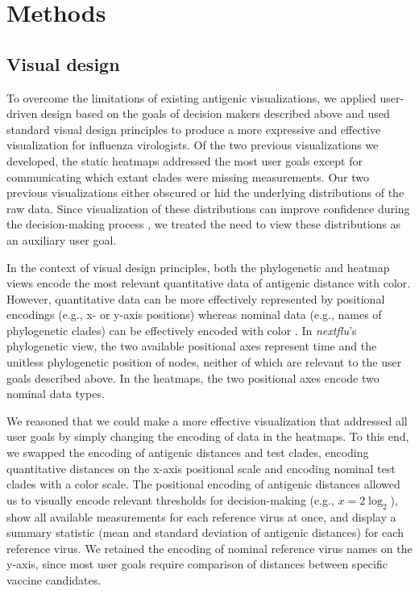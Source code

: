 \documentclass[utf8]{FrontiersinHarvard} %
\begin{document}
\section{Methods}

\subsection{Visual design}

To overcome the limitations of existing antigenic visualizations, we applied user-driven design based on the goals of decision makers described above and used standard visual design principles to produce a more expressive and effective visualization for influenza virologists.
Of the two previous visualizations we developed, the static heatmaps addressed the most user goals except for communicating which extant clades were missing measurements.
Our two previous visualizations either obscured or hid the underlying distributions of the raw data.
Since visualization of these distributions can improve confidence during the decision-making process \citep{correll2014error,Hullman2015,Fernandes2018}, we treated the need to view these distributions as an auxiliary user goal.

In the context of visual design principles, both the phylogenetic and heatmap views encode the most relevant quantitative data of antigenic distance with color.
However, quantitative data can be more effectively represented by positional encodings (e.g., x- or y-axis positions) whereas nominal data (e.g., names of phylogenetic clades) can be effectively encoded with color \citep{Mackinlay1986}.
In \emph{nextflu}'s phylogenetic view, the two available positional axes represent time and the unitless phylogenetic position of nodes, neither of which are relevant to the user goals described above.
In the heatmaps, the two positional axes encode two nominal data types.

We reasoned that we could make a more effective visualization that addressed all user goals by simply changing the encoding of data in the heatmaps.
To this end, we swapped the encoding of antigenic distances and test clades, encoding quantitative distances on the x-axis positional scale and encoding nominal test clades with a color scale.
The positional encoding of antigenic distances allowed us to visually encode relevant thresholds for decision-making (e.g., $x = 2\log_{2}$), show all available measurements for each reference virus at once, and display a summary statistic (mean and standard deviation of antigenic distances) for each reference virus.
We retained the encoding of nominal reference virus names on the y-axis, since most user goals require comparison of distances between specific vaccine candidates.
\end{document}
